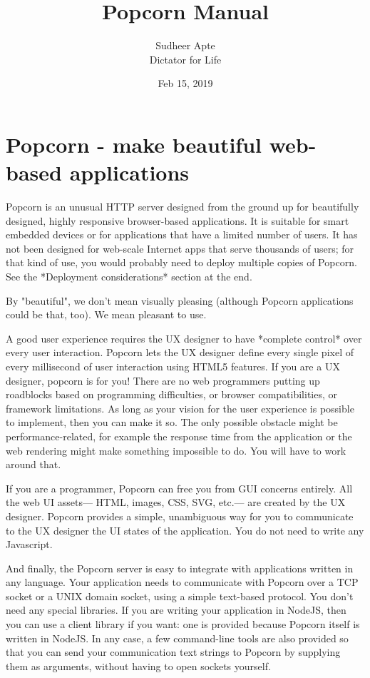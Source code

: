 \documentclass[12pt]{article}
\title{Popcorn Manual}
\author{Sudheer Apte\\\small Dictator for Life}
\date{Feb 15, 2019}
\begin{document}
\maketitle

\section{Popcorn - make beautiful web-based applications}

Popcorn is an unusual HTTP server designed from the ground up for
beautifully designed, highly responsive browser-based applications. It
is suitable for smart embedded devices or for applications that have a
limited number of users. It has not been designed for web-scale
Internet apps that serve thousands of users; for that kind of use, you
would probably need to deploy multiple copies of Popcorn. See the
*Deployment considerations* section at the end.

By "beautiful", we don't mean visually pleasing (although Popcorn
applications could be that, too). We mean pleasant to use.

A good user experience requires the UX designer to have *complete
control* over every user interaction. Popcorn lets the UX designer
define every single pixel of every millisecond of user interaction
using HTML5 features. If you are a UX designer, popcorn is for you!
There are no web programmers putting up roadblocks based on
programming difficulties, or browser compatibilities, or framework
limitations. As long as your vision for the user experience is
possible to implement, then you can make it so. The only possible
obstacle might be performance-related, for example the response time
from the application or the web rendering might make something
impossible to do. You will have to work around that.

If you are a programmer, Popcorn can free you from GUI concerns
entirely. All the web UI assets--- HTML, images, CSS, SVG, etc.--- are
created by the UX designer. Popcorn provides a simple, unambiguous way
for you to communicate to the UX designer the UI states of the
application. You do not need to write any Javascript.

And finally, the Popcorn server is easy to integrate with applications
written in any language. Your application needs to communicate with
Popcorn over a TCP socket or a UNIX domain socket, using a simple
text-based protocol. You don't need any special libraries. If you are
writing your application in NodeJS, then you can use a client library
if you want: one is provided because Popcorn itself is written in
NodeJS. In any case, a few command-line tools are also provided so
that you can send your communication text strings to Popcorn by
supplying them as arguments, without having to open sockets yourself.
\end{document}
